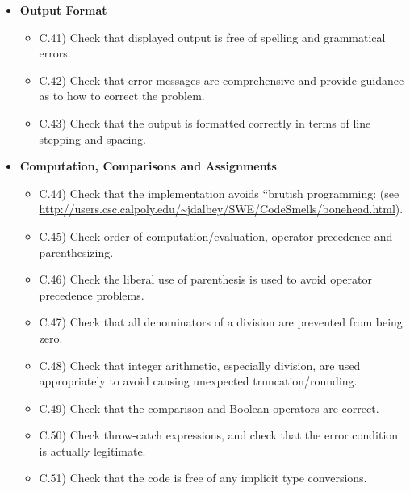 \documentclass[../../codeInspection.tex]{subfiles}
\begin{document}
\begin{itemize}
				\item 	\textbf{Output Format}
						\begin{itemize}

							\item C.41)\label{C:41} Check that displayed output is free of spelling and grammatical errors.

							\item C.42)\label{C:42} Check that error messages are comprehensive and provide guidance as to how to correct the problem.

							\item C.43)\label{C:43} Check that the output is formatted correctly in terms of line stepping and spacing.

						\end{itemize}

				\item 	\textbf{Computation, Comparisons and Assignments}
						\begin{itemize}

							\item C.44)\label{C:44} Check that the implementation avoids “brutish programming: (see \url{http://users.csc.calpoly.edu/~jdalbey/SWE/CodeSmells/bonehead.html}).

							\item C.45)\label{C:45} Check order of computation/evaluation, operator precedence and parenthesizing.

							\item C.46)\label{C:46} Check the liberal use of parenthesis is used to avoid operator precedence problems.

							\item C.47)\label{C:47} Check that all denominators of a division are prevented from being zero.

							\item C.48)\label{C:48} Check that integer arithmetic, especially division, are used appropriately to avoid causing unexpected truncation/rounding.

							\item C.49)\label{C:49} Check that the comparison and Boolean operators are correct.

							\item C.50)\label{C:50} Check throw-catch expressions, and check that the error condition is actually legitimate.

							\item C.51)\label{C:51} Check that the code is free of any implicit type conversions.


\end{itemize}
\end{itemize}
\end{document}
